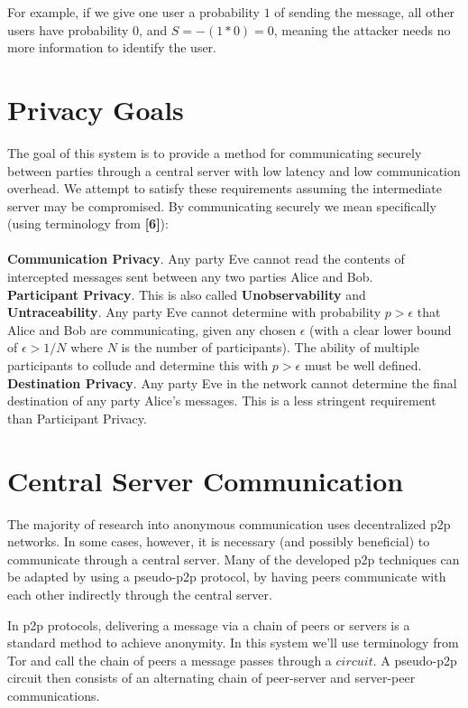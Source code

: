 \documentclass{paper}
\begin{document}
For example, if we give one user a probability $1$ of sending the message, all other users have probability 0, and $S = -(1 * 0) = 0$, meaning the attacker needs no more information to identify the user. 



\section{Privacy Goals}
  The goal of this system is to provide a method for communicating securely between parties through a central server with low latency and low communication overhead. We attempt to satisfy these requirements assuming the intermediate server may be compromised. By communicating securely we mean specifically (using terminology from \textbf{[6]}):
  \\\\\textbf{Communication Privacy}. Any party Eve cannot read the contents of intercepted messages sent between any two parties Alice and Bob. 
  \\\textbf{Participant Privacy}. This is also called \textbf{Unobservability} and \textbf{Untraceability}. Any party Eve cannot determine with probability $p > \epsilon$ that Alice and Bob are communicating, given any chosen $\epsilon$ (with a clear lower bound of $\epsilon > 1/N$ where $N$ is the number of participants). The ability of multiple participants to collude and determine this with $p > \epsilon$ must be well defined.
  \\\textbf{Destination Privacy}. Any party Eve in the network cannot determine the final destination of any party Alice's messages. This is a less stringent requirement than Participant Privacy.
\section{Central Server Communication}
 The majority of research into anonymous communication uses decentralized p2p networks. In some cases, however, it is necessary (and possibly beneficial) to communicate through a central server. Many of the developed p2p techniques can be adapted by using a pseudo-p2p protocol, by having peers communicate with each other indirectly through the central server. 

 In p2p protocols, delivering a message via a chain of peers or servers is a standard method to achieve anonymity. In this system we'll use terminology from Tor and call the chain of peers a message passes through a $circuit$. A pseudo-p2p circuit then consists of an alternating chain of peer-server and server-peer communications.
\end{document}
